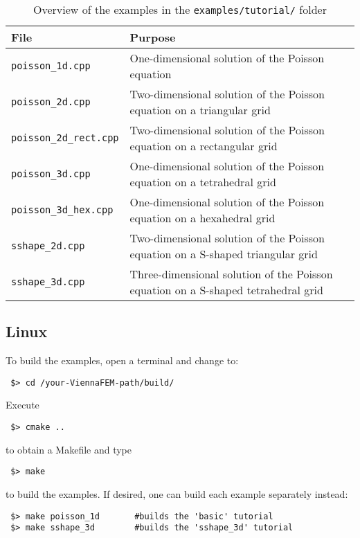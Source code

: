 \begin{table}[tb]
\begin{center}
\begin{tabular}{l|p{8.5cm}}
File & Purpose\\
\hline
\texttt{poisson\_1d.cpp}              & One-dimensional solution of the Poisson equation \\
\texttt{poisson\_2d.cpp}              & Two-dimensional solution of the Poisson equation on a triangular grid\\
\texttt{poisson\_2d\_rect.cpp}        & Two-dimensional solution of the Poisson equation on a rectangular grid\\
\texttt{poisson\_3d.cpp}              & One-dimensional solution of the Poisson equation on a tetrahedral grid\\
\texttt{poisson\_3d\_hex.cpp}         & One-dimensional solution of the Poisson equation on a hexahedral grid\\
\texttt{sshape\_2d.cpp}               & Two-dimensional solution of the Poisson equation on a S-shaped triangular grid\\
\texttt{sshape\_3d.cpp}               & Three-dimensional solution of the Poisson equation on a S-shaped tetrahedral grid\\
\end{tabular}
\caption{Overview of the examples in the \texttt{examples/tutorial/} folder}
\label{tab:tutorial-dependencies}
\end{center}
\end{table}

\subsection{Linux}
To build the examples, open a terminal and change to:

\begin{lstlisting}
 $> cd /your-ViennaFEM-path/build/
\end{lstlisting}
Execute
\begin{lstlisting}
 $> cmake ..
\end{lstlisting}
to obtain a Makefile and type
\begin{lstlisting}
 $> make 
\end{lstlisting}
to build the examples. If desired, one can build each example separately instead:
\begin{lstlisting}
 $> make poisson_1d       #builds the 'basic' tutorial
 $> make sshape_3d        #builds the 'sshape_3d' tutorial
\end{lstlisting}

